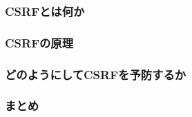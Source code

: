 \subsubsection{CSRFとは何か}

\subsubsection{CSRFの原理}

\subsubsection{どのようにしてCSRFを予防するか}

\subsubsection{まとめ}

